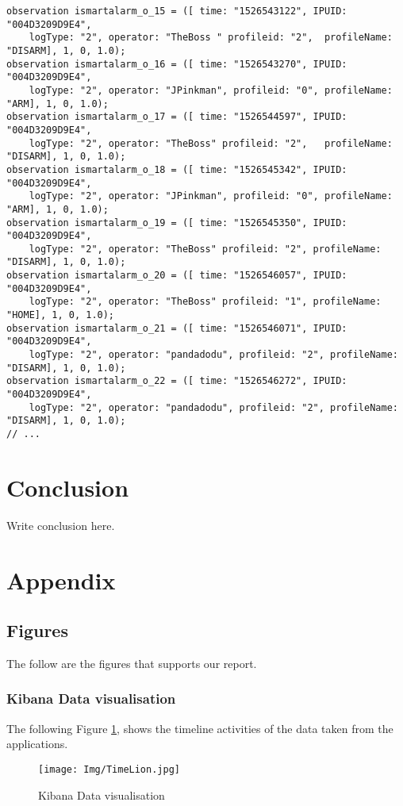 \documentclass{easychair}
\begin{document}
\begin{lstlisting}
observation ismartalarm_o_15 = ([ time: "1526543122", IPUID: "004D3209D9E4",
	logType: "2", operator: "TheBoss " profileid: "2",  profileName: "DISARM], 1, 0, 1.0);
observation ismartalarm_o_16 = ([ time: "1526543270", IPUID: "004D3209D9E4",
	logType: "2", operator: "JPinkman", profileid: "0", profileName: "ARM], 1, 0, 1.0);
observation ismartalarm_o_17 = ([ time: "1526544597", IPUID: "004D3209D9E4",
	logType: "2", operator: "TheBoss" profileid: "2", 	profileName: "DISARM], 1, 0, 1.0);
observation ismartalarm_o_18 = ([ time: "1526545342", IPUID: "004D3209D9E4",
	logType: "2", operator: "JPinkman", profileid: "0", profileName: "ARM], 1, 0, 1.0);
observation ismartalarm_o_19 = ([ time: "1526545350", IPUID: "004D3209D9E4",
	logType: "2", operator: "TheBoss" profileid: "2", profileName: "DISARM], 1, 0, 1.0);
observation ismartalarm_o_20 = ([ time: "1526546057", IPUID: "004D3209D9E4",
	logType: "2", operator: "TheBoss" profileid: "1", profileName: "HOME], 1, 0, 1.0);
observation ismartalarm_o_21 = ([ time: "1526546071", IPUID: "004D3209D9E4",
	logType: "2", operator: "pandadodu", profileid: "2", profileName: "DISARM], 1, 0, 1.0);
observation ismartalarm_o_22 = ([ time: "1526546272", IPUID: "004D3209D9E4",
	logType: "2", operator: "pandadodu", profileid: "2", profileName: "DISARM], 1, 0, 1.0);
// ...

\end{lstlisting}

\section{Conclusion}
\label{sect:conclusion} Write conclusion here.


\newpage
\section{Appendix}

\subsection{Figures}
The follow are the figures that supports our report.
\subsubsection{Kibana Data visualisation}
The following Figure \ref{fig:Kibana Data visualisation}, shows the timeline activities of the data taken from the applications.
\begin{figure}[h]
    \centering
    \texttt{[image: Img/TimeLion.jpg]}
    \caption{Kibana Data visualisation}
    \label{fig:Kibana Data visualisation}
\end{figure}
\end{document}
